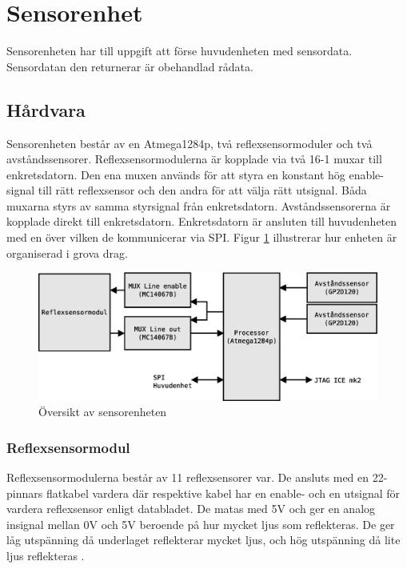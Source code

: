 
\section{Sensorenhet}

Sensorenheten har till uppgift att förse huvudenheten med sensordata. Sensordatan den returnerar är obehandlad rådata.

\subsection{Hårdvara}

Sensorenheten består av en Atmega1284p, två reflexsensormoduler och två avståndssensorer. Reflexsensormodulerna är kopplade via två 16-1 muxar till enkretsdatorn. Den ena muxen används för att styra en konstant hög enable-signal till rätt reflexsensor och den andra för att välja rätt utsignal. Båda muxarna styrs av samma styrsignal från enkretsdatorn. Avståndssensorerna är kopplade direkt till enkretsdatorn. Enkretsdatorn är ansluten till huvudenheten med en  över vilken de kommunicerar via SPI. Figur \ref{sensor-oversikt} illustrerar hur enheten är organiserad i grova drag. 

\begin{figure}[h!]
	\centering
	\includegraphics[scale=0.4]{grafik/sensorenhet-oversikt}
	\caption{Översikt av sensorenheten } \label{sensor-oversikt}
\end{figure}

\subsubsection{Reflexsensormodul}
Reflexsensormodulerna består av 11 reflexsensorer var. De ansluts med en 22-pinnars flatkabel vardera där respektive kabel har en enable- och en utsignal för vardera reflexsensor enligt databladet\cite{reflexsensormodul}. De matas med 5V och ger en analog insignal mellan 0V och 5V beroende på hur mycket ljus som reflekteras. De ger låg utspänning då underlaget reflekterar mycket ljus, och hög utspänning då lite ljus reflekteras .

